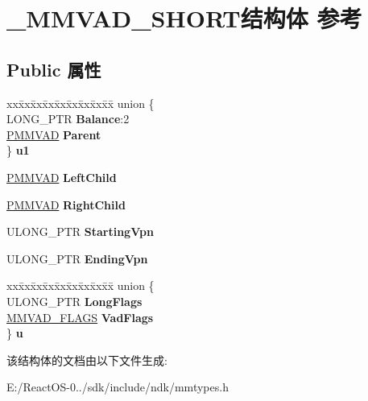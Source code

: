 \hypertarget{struct___m_m_v_a_d___s_h_o_r_t}{}\section{\+\_\+\+M\+M\+V\+A\+D\+\_\+\+S\+H\+O\+R\+T结构体 参考}
\label{struct___m_m_v_a_d___s_h_o_r_t}
\subsection*{Public 属性}
\begin{DoxyCompactItemize}
\item 
\mbox{\label{struct___m_m_v_a_d___s_h_o_r_t_af62f6db5307a9bc3347a6bdf7bfb0b65}} 
\begin{tabbing}
xx\=xx\=xx\=xx\=xx\=xx\=xx\=xx\=xx\=\kill
union \{\\
\>LONG\_PTR {\bfseries Balance}:2\\
\>\hyperlink{struct___m_m_v_a_d}{PMMVAD} {\bfseries Parent}\\
\} {\bfseries u1}\\

\end{tabbing}\item 
\mbox{\label{struct___m_m_v_a_d___s_h_o_r_t_a4d84be534e710a38ee87ed50c95330a4}} 
\hyperlink{struct___m_m_v_a_d}{P\+M\+M\+V\+AD} {\bfseries Left\+Child}
\item 
\mbox{\label{struct___m_m_v_a_d___s_h_o_r_t_a0b526600e3cad5a7e86aae018f028060}} 
\hyperlink{struct___m_m_v_a_d}{P\+M\+M\+V\+AD} {\bfseries Right\+Child}
\item 
\mbox{\label{struct___m_m_v_a_d___s_h_o_r_t_a5a30f2abe19e5058b297ad296b408da7}} 
U\+L\+O\+N\+G\+\_\+\+P\+TR {\bfseries Starting\+Vpn}
\item 
\mbox{\label{struct___m_m_v_a_d___s_h_o_r_t_aff9d8b215f0b1114a7c4f60e9a891aad}} 
U\+L\+O\+N\+G\+\_\+\+P\+TR {\bfseries Ending\+Vpn}
\item 
\mbox{\label{struct___m_m_v_a_d___s_h_o_r_t_a5c6f9cf235f2d389e2018519ff8dd8de}} 
\begin{tabbing}
xx\=xx\=xx\=xx\=xx\=xx\=xx\=xx\=xx\=\kill
union \{\\
\>ULONG\_PTR {\bfseries LongFlags}\\
\>\hyperlink{struct___m_m_v_a_d___f_l_a_g_s}{MMVAD\_FLAGS} {\bfseries VadFlags}\\
\} {\bfseries u}\\

\end{tabbing}\end{DoxyCompactItemize}


该结构体的文档由以下文件生成\+:\begin{DoxyCompactItemize}
\item 
E\+:/\+React\+O\+S-\/0../sdk/include/ndk/mmtypes.\+h\end{DoxyCompactItemize}
